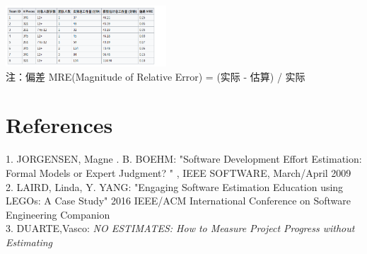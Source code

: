 \includegraphics[width=6cm]{Screenshotfrom2023-01-0602-55-33.png}\\
注：偏差 MRE(Magnitude of Relative Error) = \textbar{} (实际 - 估算)
\textbar{} / 实际

\hypertarget{references}{%
\section{References}\label{references}}

1. JORGENSEN, Magne . B. BOEHM: "Software Development Effort Estimation:
Formal Models or Expert Judgment? " , IEEE SOFTWARE, March/April 2009\\
2. LAIRD, Linda, Y. YANG: "Engaging Software Estimation Education using
LEGOs: A Case Study" 2016 IEEE/ACM International Conference on Software
Engineering Companion\\
3. DUARTE,Vasco: \emph{NO ESTIMATES: How to Measure Project Progress
without Estimating}\\



